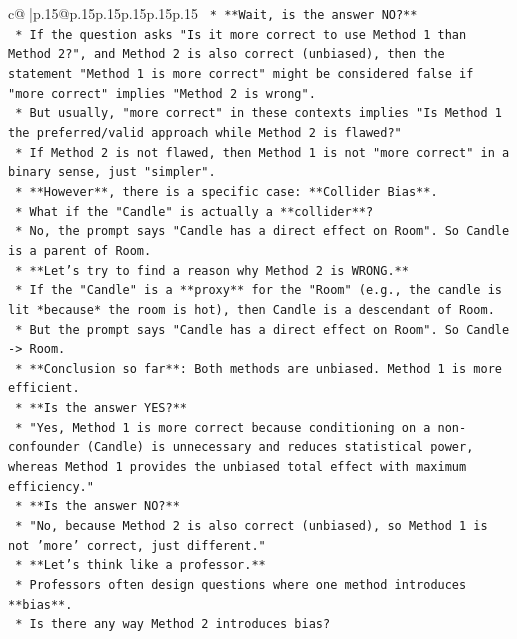 \documentclass{article}
\begin{document}
{\begin{supertabular}{c@{$\;$}|p{.15\linewidth}@{}p{.15\linewidth}p{.15\linewidth}p{.15\linewidth}p{.15\linewidth}p{.15\linewidth}}
{{{\texttt{    *   **Wait, is the answer NO?**} \\
\texttt{    *   If the question asks "Is it more correct to use Method 1 than Method 2?", and Method 2 is also correct (unbiased), then the statement "Method 1 is more correct" might be considered false if "more correct" implies "Method 2 is wrong".} \\
\texttt{    *   But usually, "more correct" in these contexts implies "Is Method 1 the preferred/valid approach while Method 2 is flawed?"} \\
\texttt{    *   If Method 2 is not flawed, then Method 1 is not "more correct" in a binary sense, just "simpler".} \\
\texttt{    *   **However**, there is a specific case: **Collider Bias**.} \\
\texttt{    *   What if the "Candle" is actually a **collider**?} \\
\texttt{    *   No, the prompt says "Candle has a direct effect on Room". So Candle is a parent of Room.} \\
\texttt{    *   **Let's try to find a reason why Method 2 is WRONG.**} \\
\texttt{    *   If the "Candle" is a **proxy** for the "Room" (e.g., the candle is lit *because* the room is hot), then Candle is a descendant of Room.} \\
\texttt{    *   But the prompt says "Candle has a direct effect on Room". So Candle {-}> Room.} \\
\texttt{    *   **Conclusion so far**: Both methods are unbiased. Method 1 is more efficient.} \\
\texttt{    *   **Is the answer YES?**} \\
\texttt{    *   "Yes, Method 1 is more correct because conditioning on a non{-}confounder (Candle) is unnecessary and reduces statistical power, whereas Method 1 provides the unbiased total effect with maximum efficiency."} \\
\texttt{    *   **Is the answer NO?**} \\
\texttt{    *   "No, because Method 2 is also correct (unbiased), so Method 1 is not 'more' correct, just different."} \\
\texttt{    *   **Let's think like a professor.**} \\
\texttt{    *   Professors often design questions where one method introduces **bias**.} \\
\texttt{    *   Is there any way Method 2 introduces bias?} \\
}}}
\end{supertabular}}
\end{document}
